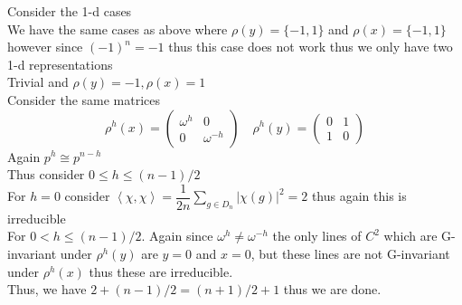 \documentclass[12pt, letterpaper]{article}
\theoremstyle{definition}
\newcommand{\ang}[1]{\left\langle #1 \right\rangle}
\begin{document}
Consider the 1-d cases\\
We have the same cases as above where $\rho(y)=\{-1,1\}$ and $\rho(x)=\{-1,1\}$ however since $(-1)^n=-1$ thus this case does not work thus we only have two 1-d representations\\
Trivial and $\rho(y)=-1, \rho(x)=1$\\
Consider the same matrices\\
\[
\rho^h(x)=\begin{pmatrix}
    \omega^h & 0\\
    0 & \omega^{-h}
\end{pmatrix}
\quad
\rho^h(y)=\begin{pmatrix}
    0 & 1\\
    1 & 0
\end{pmatrix}
\]
Again $p^h \cong p^{n-h}$\\
Thus consider $0 \leq h \leq (n-1)/2$\\
For $h=0$ consider $\ang{\chi,\chi}=\dfrac{1}{2n}\sum_{g\in D_n}|\chi(g)|^2=2$ thus again this is irreducible\\
For $0 < h \leq (n-1)/2$. Again since $\omega^h \neq \omega^{-h}$ the only lines of $C^2$ which are G-invariant under $\rho^h(y)$ are $y=0$ and $x=0$,
but these lines are not G-invariant under $\rho^h(x)$ thus these are irreducible.\\
Thus, we have $2+(n-1)/2=(n+1)/2+1$ thus we are done.

\newpage
\end{document}
